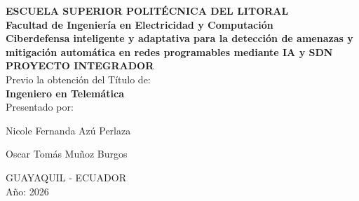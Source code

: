 \begin{titlepage}

\newcommand{\HRule}{\rule{\linewidth}{0.5mm}} %

\center %

{\fontsize{16}{20}\selectfont \textbf{ESCUELA SUPERIOR POLIT\'ECNICA DEL LITORAL}}
\\[3.0em]
{\fontsize{16}{20}\selectfont \textbf{Facultad de Ingenier\'ia en Electricidad y Computaci\'on}}\\[3.0em]


{\fontsize{14}{18}\selectfont \textbf{Ciberdefensa inteligente y adaptativa para la detecci\'on de amenazas y mitigaci\'on autom\'atica en redes programables mediante IA y SDN}}\\[3.0em]
{\fontsize{16}{20}\selectfont \textbf{PROYECTO INTEGRADOR}}\\[1.5em]
{\fontsize{16}{20}\selectfont Previo la obtenci\'on del T\'itulo de:}\\[1.5em]
{\fontsize{16}{20}\selectfont \textbf{Ingeniero en Telem\'atica}}\\[4.5em]

{\fontsize{16}{20}\selectfont Presentado por:}\\[1.5em]
\author{Nicole Fernanda Az\'u Perlaza} {\fontsize{16}{20}\selectfont  Nicole Fernanda Az\'u Perlaza}\\[1.5em]
\author{Oscar Tom\'as Mu\~noz Burgos} {\fontsize{16}{20}\selectfont  Oscar Tom\'as Mu\~noz Burgos}

\vspace{6.0em} %
{\fontsize{16}{20}\selectfont GUAYAQUIL - ECUADOR}\\[1.5em]
{\fontsize{16}{20}\selectfont A\~no: 2026}

\vfill %
\end{titlepage}